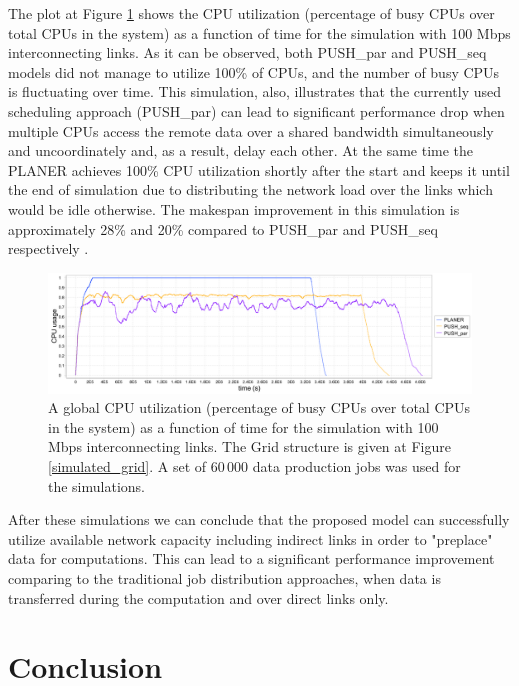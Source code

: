 \documentclass{svjour3}                     %
\begin{document}
The plot at Figure \ref{multi_cpu_consumption} shows the CPU utilization (percentage of busy CPUs over total CPUs in the system) as a function of time for the simulation with 100 Mbps interconnecting links. As it can be observed, both PUSH\_par and PUSH\_seq models did not manage to utilize 100\% of CPUs, and the number of busy CPUs is fluctuating over time. This simulation, also, illustrates that the currently used scheduling approach (PUSH\_par) can lead to significant performance drop when multiple CPUs access the remote data over a shared bandwidth simultaneously and uncoordinately and, as a result, delay each other. At the same time the PLANER achieves 100\% CPU utilization shortly after the start and keeps it until the end of simulation due to distributing the network load over the links which would be idle otherwise. The makespan improvement in this simulation is approximately 28\% and 20\% compared to PUSH\_par and PUSH\_seq respectively .
\begin{figure}
  \begin{center}
    \includegraphics [trim= 0mm 00mm 0mm 00mm , clip,width=1\textwidth]{pic/3models_link01.png}
    \caption{A global CPU utilization (percentage of busy CPUs over total CPUs in the system) as a function of time for the simulation with 100 Mbps interconnecting links. The Grid structure is given at Figure \ref{simulated_grid}. A set of 60\,000 data production jobs was used for the simulations.}
      \label{multi_cpu_consumption}	
  \end{center}  
\end{figure}

After these simulations we can conclude that the proposed model can successfully utilize available network capacity including indirect links in order to "preplace" data for computations. This can lead to a significant performance improvement comparing to the traditional job distribution approaches, when data is transferred during the computation and over direct links only. 

\section{Conclusion}
\label{Conclusion}
\end{document}
